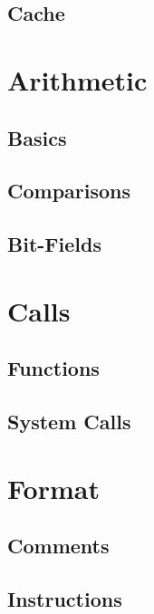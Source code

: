 \documentclass{scrartcl}
\begin{document}
        \subsection{Cache}
    \section{Arithmetic}
        \subsection{Basics}
        \subsection{Comparisons}
        \subsection{Bit-Fields}
    \section{Calls}
        \subsection{Functions}
        \subsection{System Calls}
    \section{Format}
        \subsection{Comments}
        \subsection{Instructions}
\end{document}
